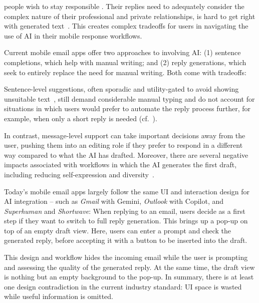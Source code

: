  people  wish to stay responsible  . Their replies need to adequately consider the complex nature of their professional and private relationships,  is hard to get right with generated text~\cite{fu2024texttoself, Liu2022aimailperception, Mieczkowski2021, Robertson2021cantreply}. This creates complex tradeoffs for users in navigating the use of AI in their mobile response workflows.



Current mobile email apps offer two approaches to involving AI: (1) sentence completions, which help with manual writing; and (2) reply generations, which seek to entirely replace the need for manual writing. 
Both come with tradeoffs:

Sentence-level suggestions, often sporadic and utility-gated to avoid showing unsuitable text~\cite{Chen2019smartcompose}, still demand considerable manual typing and do not account for situations in which users would prefer to automate the reply process further, for example, when only a short reply is needed (cf.~\cite{Kannan2016smartreply}).

In contrast, message-level support can take important decisions away from the user, pushing them into an editing role if they prefer to respond in a different way compared to what the AI has drafted. Moreover, there are several negative impacts associated with workflows in which the AI generates the first draft, including reducing self-expression and diversity~\cite{Li2024aivalue}.

Today's mobile email apps largely follow the same UI and interaction design for AI integration -- such as \textit{Gmail} with Gemini, \textit{Outlook} with Copilot, and \textit{Superhuman} and \textit{Shortwave}: When replying to an email, users decide as a first step if they want to switch to full reply generation. This brings up a pop-up on top of an empty draft view. Here, users can enter a prompt and check the generated reply, before accepting it with a button to be inserted into the draft.  

This design and workflow hides the incoming email while the user is prompting and assessing the quality of the generated reply. At the same time, the draft view is nothing but an empty background to the pop-up.
In summary, there is at least one design contradiction in the current industry standard: UI space is wasted while useful information is omitted.

